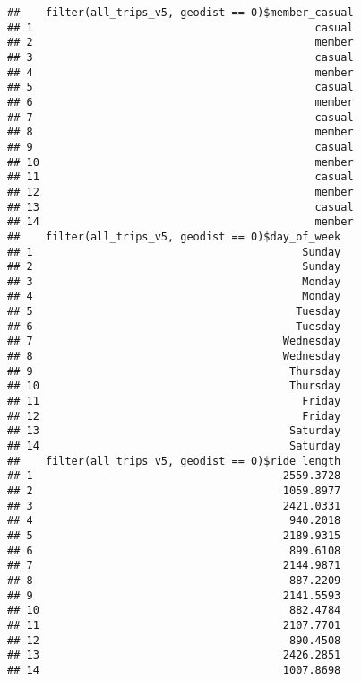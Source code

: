 \documentclass[
]{article}
\begin{document}
\begin{verbatim}
##    filter(all_trips_v5, geodist == 0)$member_casual
## 1                                            casual
## 2                                            member
## 3                                            casual
## 4                                            member
## 5                                            casual
## 6                                            member
## 7                                            casual
## 8                                            member
## 9                                            casual
## 10                                           member
## 11                                           casual
## 12                                           member
## 13                                           casual
## 14                                           member
##    filter(all_trips_v5, geodist == 0)$day_of_week
## 1                                          Sunday
## 2                                          Sunday
## 3                                          Monday
## 4                                          Monday
## 5                                         Tuesday
## 6                                         Tuesday
## 7                                       Wednesday
## 8                                       Wednesday
## 9                                        Thursday
## 10                                       Thursday
## 11                                         Friday
## 12                                         Friday
## 13                                       Saturday
## 14                                       Saturday
##    filter(all_trips_v5, geodist == 0)$ride_length
## 1                                       2559.3728
## 2                                       1059.8977
## 3                                       2421.0331
## 4                                        940.2018
## 5                                       2189.9315
## 6                                        899.6108
## 7                                       2144.9871
## 8                                        887.2209
## 9                                       2141.5593
## 10                                       882.4784
## 11                                      2107.7701
## 12                                       890.4508
## 13                                      2426.2851
## 14                                      1007.8698
\end{verbatim}
\end{document}
